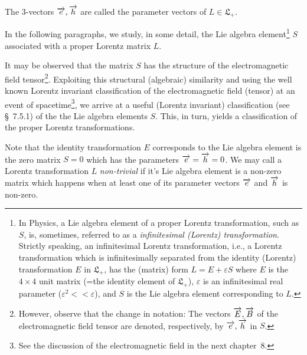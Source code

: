  The 3-vectors 
$\overrightarrow{e},\overrightarrow{h}$ are called the {parameter vectors} 
of $L\in \mathfrak{L}_{+}$.

In the following paragraphs, we study, in some  
detail, 
the Lie algebra element\footnote{In Physics,  a Lie 
algebra element of a proper Lorentz transformation, 
such as $S$, is, sometimes, referred to as  a 
\textsl{infinitesimal (Lorentz) transformation}. 
Strictly speaking, an infinitesimal Lorentz 
transformation, i.e., a Lorentz transformation which 
is 
infinitesimally separated from the identity (Lorentz) 
transformation $E$ in $\mathfrak{L}_{+}$, has the 
(matrix) form $L =E+\varepsilon S$ where $E$ is the 
$4\times 4$ unit matrix (=the identity element of 
$\mathfrak{L}_{+}$), $\varepsilon$ is an infinitesimal 
real parameter ($\varepsilon^2<<\varepsilon $), and  
$S$ is the Lie algebra element corresponding to $L$.} 
$S$ associated with a proper Lorentz matrix $L$. 

It may be observed that the matrix $S$ has the 
structure of the electromagnetic field 
tensor\footnote{However, observe that the change in 
notation: The vectors $\overrightarrow{E}, \overrightarrow{B}$ of the 
electromagnetic field tensor are denoted, 
respectively, 
by $\overrightarrow{e}, \overrightarrow{h}$ in $S$.}. Exploiting this 
structural  (algebraic) similarity and using the well 
known Lorentz invariant classification of the 
electromagnetic  field (tensor) at an event of 
spacetime\footnote{See  the discussion of the 
electromagnetic field in the next chapter~8.}, we 
arrive at a useful (Lorentz invariant) classification 
(see \S~7.5.1) of the the Lie algebra elements $S$. 
This, in turn, yields a classification of the proper 
Lorentz transformations.


Note that the identity transformation $E$ corresponds 
to the Lie algebra element is the zero matrix $S=0$ 
which has the parameters $\overrightarrow{e}=\overrightarrow{h}=0$. We may 
call a Lorentz transformation $L$ \textsl{non-trivial} 
if it's Lie algebra element is a non-zero matrix which 
happens when  at least one of its parameter vectors 
$\overrightarrow{e}$ and $\overrightarrow{h}$ is non-zero.

